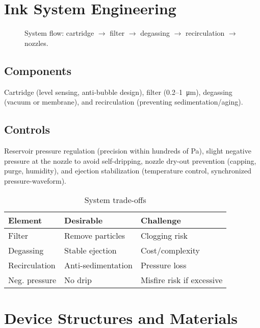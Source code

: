 \documentclass[conference]{IEEEtran}
\begin{document}
\section{Ink System Engineering}

\begin{figure}[!t]
  \centering
  
  \caption{System flow: cartridge $\to$ filter $\to$ degassing $\to$ recirculation $\to$ nozzles.}
  \label{fig:system_flow}
\end{figure}

\subsection{Components}
Cartridge (level sensing, anti-bubble design), filter (0.2--\SI{1}{\micro\meter}), degassing (vacuum or membrane), and recirculation (preventing sedimentation/aging).

\subsection{Controls}
Reservoir pressure regulation (precision within hundreds of Pa), slight negative pressure at the nozzle to avoid self-dripping, nozzle dry-out prevention (capping, purge, humidity), and ejection stabilization (temperature control, synchronized pressure-waveform).

\begin{table}[!t]
\caption{System trade-offs}
\label{tab:trade}
\centering\footnotesize
\begin{tabular*}{\columnwidth}{@{\extracolsep{\fill}}lll@{}}
\toprule
Element & Desirable & Challenge \\
\midrule
Filter         & Remove particles   & Clogging risk \\
Degassing      & Stable ejection    & Cost/complexity \\
Recirculation  & Anti-sedimentation & Pressure loss \\
Neg. pressure  & No drip            & Misfire risk if excessive \\
\bottomrule
\end{tabular*}
\end{table}

\section{Device Structures and Materials}
\end{document}
